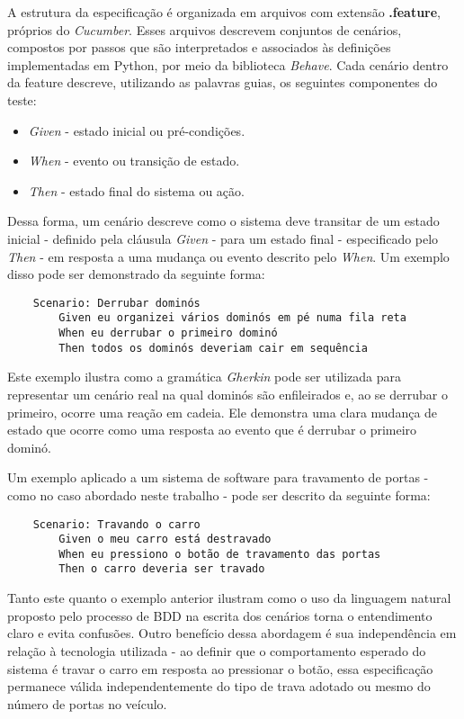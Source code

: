 A estrutura da especificação é organizada em arquivos com extensão \textbf{.feature}, próprios do \textit{Cucumber}. Esses arquivos descrevem conjuntos de cenários, compostos por 
passos que são interpretados e associados às definições implementadas em Python, por meio da biblioteca \textit{Behave}. Cada cenário dentro da feature descreve, utilizando 
as palavras guias, os seguintes componentes do teste:

\begin{itemize}
   	\item \textit{Given} - estado inicial ou pré-condições.
   	\item \textit{When} - evento ou transição de estado.
   	\item \textit{Then} - estado final do sistema ou ação.
\end{itemize}

Dessa forma, um cenário descreve como o sistema deve transitar de um estado inicial - definido pela cláusula \textit{Given} - para um estado final - especificado pelo 
\textit{Then} - em resposta a uma mudança ou evento descrito pelo \textit{When}. Um exemplo disso pode ser demonstrado da seguinte forma:

\begin{verbatim}
	Scenario: Derrubar dominós
		Given eu organizei vários dominós em pé numa fila reta
		When eu derrubar o primeiro dominó
		Then todos os dominós deveriam cair em sequência 
\end{verbatim}

Este exemplo ilustra como a gramática \textit{Gherkin} pode ser utilizada para representar um cenário real na qual dominós são enfileirados e, ao se derrubar o primeiro, 
ocorre uma reação em cadeia. Ele demonstra uma clara mudança de estado que ocorre como uma resposta ao evento que é derrubar o primeiro dominó.

Um exemplo aplicado a um sistema de software para travamento de portas - como no caso abordado neste trabalho - pode ser descrito da seguinte forma:

\begin{verbatim}
	Scenario: Travando o carro
		Given o meu carro está destravado
		When eu pressiono o botão de travamento das portas
		Then o carro deveria ser travado
\end{verbatim}

Tanto este quanto o exemplo anterior ilustram como o uso da linguagem natural proposto pelo processo de BDD na escrita dos cenários torna o entendimento claro 
e evita confusões. Outro benefício dessa abordagem é sua independência em relação à tecnologia utilizada - ao definir que o comportamento esperado do sistema é 
travar o carro em resposta ao pressionar o botão, essa especificação permanece válida independentemente do tipo de trava adotado ou mesmo do número de portas no veículo.

